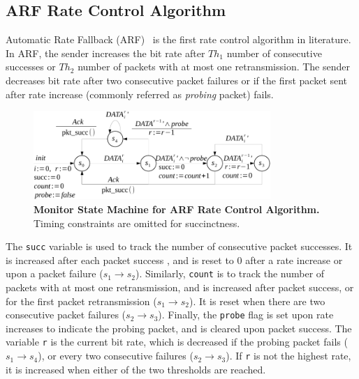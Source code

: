 \subsection{ARF Rate Control Algorithm}
\label{subsec:arf}

Automatic Rate Fallback (ARF)~\cite{kamerman1997wavelan} is the first rate
control algorithm in literature. In ARF, the sender increases the bit rate after
$Th_1$ number of consecutive successes or $Th_2$ number of packets with at most
one retransmission. The sender decreases bit rate after two consecutive packet
failures or if the first packet sent after rate increase (commonly referred as
\textit{probing} packet) fails.


\begin{figure}[h!]
  \centering
  \includegraphics[width=0.8\textwidth]{./figures/arf_sm.pdf}
  \caption{\textbf{Monitor State Machine for ARF Rate Control Algorithm.} Timing
  constraints are omitted for succinctness.}
  \label{fig:arf_sm}
\end{figure}


The \texttt{succ} variable is used to track the number of consecutive packet
successes. It is increased after each packet success , and is reset to 0 after a
rate increase or upon a packet failure ($s_1\rightarrow s_2$).  Similarly,
\texttt{count} is to track the number of packets with at most one
retransmission, and is increased after packet success, or for the first packet
retransmission ($s_1\rightarrow s_2$). It is reset when there are two
consecutive packet failures ($s_2\rightarrow s_3$). Finally, the \texttt{probe}
flag is set upon rate increases to indicate the probing packet, and is cleared
upon packet success. The variable \texttt{r} is the current bit rate, which is
decreased if the probing packet fails ($s_1\rightarrow s_4$), or every two
consecutive failures ($s_2\rightarrow s_3$). If \texttt{r} is not the highest
rate, it is increased when either of the two thresholds are reached.


